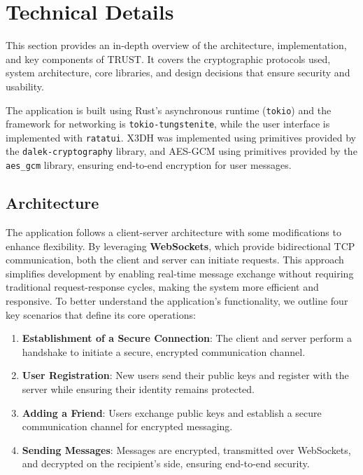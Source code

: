 \chapter{Technical Details}
\label{cha:TechnicalDetails}

This section provides an in-depth overview of the architecture, implementation, and key components of TRUST. It covers the cryptographic protocols used, system architecture, core libraries, and design decisions that ensure security and usability.

The application is built using Rust’s asynchronous runtime (\texttt{tokio}) and the  framework for networking is \texttt{tokio-tungstenite}, while the user interface is implemented with \texttt{ratatui}. X3DH was implemented using primitives provided by the \texttt{dalek-cryptography} library, and AES-GCM using primitives provided by the \texttt{aes\_gcm} library, ensuring end-to-end encryption for user messages.


\section{Architecture}
\label{sec:Architecture}

The application follows a client-server architecture with some modifications to enhance flexibility. By leveraging \textbf{WebSockets}, which provide bidirectional TCP communication, both the client and server can initiate requests. This approach simplifies development by enabling real-time message exchange without requiring traditional request-response cycles, making the system more efficient and responsive.
To better understand the application's functionality, we outline four key scenarios that define its core operations:

\begin{enumerate}
    \item \textbf{Establishment of a Secure Connection}: The client and server perform a handshake to initiate a secure, encrypted communication channel.
    \item \textbf{User Registration}: New users send their public keys and register with the server while ensuring their identity remains protected.
    \item \textbf{Adding a Friend}: Users exchange public keys and establish a secure communication channel for encrypted messaging.
    \item \textbf{Sending Messages}: Messages are encrypted, transmitted over WebSockets, and decrypted on the recipient’s side, ensuring end-to-end security.
\end{enumerate}

